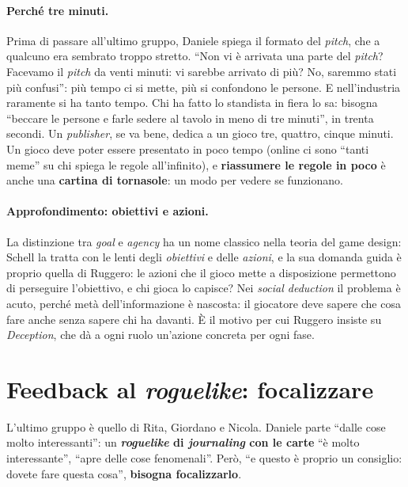 \paragraph{Perché tre minuti.} Prima di passare all'ultimo gruppo, Daniele spiega il
formato del \emph{pitch}, che a qualcuno era sembrato troppo stretto. ``Non vi è arrivata
una parte del \emph{pitch}? Facevamo il \emph{pitch} da venti minuti: vi sarebbe arrivato
di più? No, saremmo stati più confusi'': più tempo ci si mette, più si confondono le
persone. E nell'industria raramente si ha tanto tempo. Chi ha fatto lo standista in fiera
lo sa: bisogna ``beccare le persone e farle sedere al tavolo in meno di tre minuti'', in
trenta secondi. Un \emph{publisher}, se va bene, dedica a un gioco tre, quattro, cinque
minuti. Un gioco deve poter essere presentato in poco tempo (online ci sono ``tanti meme''
su chi spiega le regole all'infinito), e \textbf{riassumere le regole in poco} è anche una
\textbf{cartina di tornasole}: un modo per vedere se funzionano.

\paragraph{Approfondimento: obiettivi e azioni.} La distinzione tra \emph{goal} e
\emph{agency} ha un nome classico nella teoria del game design: Schell la tratta con le
lenti degli \emph{obiettivi} e delle \emph{azioni}, e la sua domanda guida è proprio
quella di Ruggero: le azioni che il gioco mette a disposizione permettono di perseguire
l'obiettivo, e chi gioca lo capisce? Nei \emph{social deduction} il problema è acuto,
perché metà dell'informazione è nascosta: il giocatore deve sapere che cosa fare anche
senza sapere chi ha davanti. È il motivo per cui Ruggero insiste su \emph{Deception}, che
dà a ogni ruolo un'azione concreta per ogni fase.

\section{Feedback al \emph{roguelike}: focalizzare}
\label{a11:sec:fbroguelike}

L'ultimo gruppo è quello di Rita, Giordano e Nicola. Daniele parte ``dalle cose molto
interessanti'': un \textbf{\emph{roguelike} di \emph{journaling} con le carte} ``è molto
interessante'', ``apre delle cose fenomenali''. Però, ``e questo è proprio un consiglio:
dovete fare questa cosa'', \textbf{bisogna focalizzarlo}.

